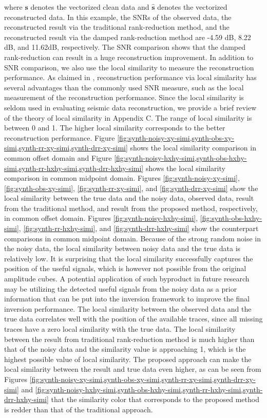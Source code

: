 where $\mathbf{s}$ denotes the vectorized clean data and $\hat{\mathbf{s}}$ denotes the vectorized reconstructed data. In this example, the SNRs of the observed data, the reconstructed result via the traditional rank-reduction method, and the reconstructed result via the damped rank-reduction method are -4.59 dB, 8.22 dB, and 11.62dB, respectively. The SNR comparison shows that the damped rank-reduction can result in a huge reconstruction improvement.  In addition to SNR comparison, we also use the local similarity to measure the reconstruction performance. As claimed in \cite{yangkang2015ortho}, reconstruction performance via local similarity has several advantages than the commonly used SNR measure, such as the local measurement of the reconstruction performance. Since the local similarity is seldom used in evaluating seismic data reconstruction, we provide a brief review of the theory of local similarity in Appendix C. The range of local similarity is between 0 and 1.  The higher local similarity corresponds to the better reconstruction performance. Figure \ref{fig:synth-noisy-xy-simi,synth-obs-xy-simi,synth-rr-xy-simi,synth-drr-xy-simi} shows the local similarity comparison in common offset domain and Figure \ref{fig:synth-noisy-hxhy-simi,synth-obs-hxhy-simi,synth-rr-hxhy-simi,synth-drr-hxhy-simi} shows the local similarity comparison in common midpoint domain. Figures \ref{fig:synth-noisy-xy-simi}, \ref{fig:synth-obs-xy-simi}, \ref{fig:synth-rr-xy-simi}, and \ref{fig:synth-drr-xy-simi} show the local similarity between the true data and the noisy data, observed data, result from the traditional method, and result from the proposed method, respectively, in common offset domain. Figures \ref{fig:synth-noisy-hxhy-simi}, \ref{fig:synth-obs-hxhy-simi}, \ref{fig:synth-rr-hxhy-simi}, and \ref{fig:synth-drr-hxhy-simi} show the counterpart comparisons in common midpoint domain. Because of the strong random noise in the noisy data, the local similarity between noisy data and the true data is relatively low. It is surprising that the local similarity successfully captures the position of the useful signals, which is however not possible from the original amplitude cubes. A potential application of such byproduct in future research may be utilizing the detected useful signals from the noisy data as a prior information that can be put into the inversion framework to improve the final inversion performance. The local similarity between the observed data and the true data correlates well with the position of the available traces, since all missing traces have a zero local similarity with the true data. The local similarity between the result from traditional rank-reduction method is much higher than that of the noisy data and the similarity value is approaching 1, which is the highest possible value of local similarity. The proposed approach can make the local similarity between the result and true data even higher, as can be seen from Figures \ref{fig:synth-noisy-xy-simi,synth-obs-xy-simi,synth-rr-xy-simi,synth-drr-xy-simi} and \ref{fig:synth-noisy-hxhy-simi,synth-obs-hxhy-simi,synth-rr-hxhy-simi,synth-drr-hxhy-simi} that the similarity color that corresponds to the proposed method is redder than that of the traditional approach. 

